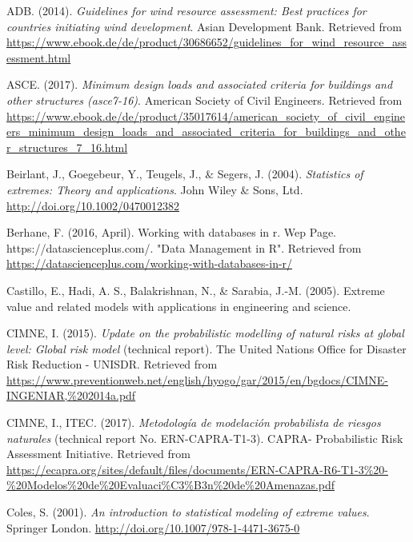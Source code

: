 \documentclass[12pt,oneside]{reedthesis}
\begin{document}

\hypertarget{refs}{}
\leavevmode\hypertarget{ref-windassessment}{}%
ADB. (2014). \emph{Guidelines for wind resource assessment: Best practices for countries initiating wind development}. Asian Development Bank. Retrieved from \url{https://www.ebook.de/de/product/30686652/guidelines_for_wind_resource_assessment.html}

\leavevmode\hypertarget{ref-Asce2017}{}%
ASCE. (2017). \emph{Minimum design loads and associated criteria for buildings and other structures (asce7-16)}. American Society of Civil Engineers. Retrieved from \url{https://www.ebook.de/de/product/35017614/american_society_of_civil_engineers_minimum_design_loads_and_associated_criteria_for_buildings_and_other_structures_7_16.html}

\leavevmode\hypertarget{ref-Beirlant2004}{}%
Beirlant, J., Goegebeur, Y., Teugels, J., \& Segers, J. (2004). \emph{Statistics of extremes: Theory and applications}. John Wiley \& Sons, Ltd. \url{http://doi.org/10.1002/0470012382}

\leavevmode\hypertarget{ref-databasesinr}{}%
Berhane, F. (2016, April). Working with databases in r. Wep Page. https://datascienceplus.com/. "Data Management in R". Retrieved from \url{https://datascienceplus.com/working-with-databases-in-r/}

\leavevmode\hypertarget{ref-Castillo2005}{}%
Castillo, E., Hadi, A. S., Balakrishnan, N., \& Sarabia, J.-M. (2005). Extreme value and related models with applications in engineering and science.

\leavevmode\hypertarget{ref-hurricanemaps}{}%
CIMNE, I. (2015). \emph{Update on the probabilistic modelling of natural risks at global level: Global risk model} (technical report). The United Nations Office for Disaster Risk Reduction - UNISDR. Retrieved from \url{https://www.preventionweb.net/english/hyogo/gar/2015/en/bgdocs/CIMNE-INGENIAR,\%202014a.pdf}

\leavevmode\hypertarget{ref-hurricanemaps2}{}%
CIMNE, I., ITEC. (2017). \emph{Metodología de modelación probabilista de riesgos naturales} (technical report No. ERN-CAPRA-T1-3). CAPRA- Probabilistic Risk Assessment Initiative. Retrieved from \url{https://ecapra.org/sites/default/files/documents/ERN-CAPRA-R6-T1-3\%20-\%20Modelos\%20de\%20Evaluaci\%C3\%B3n\%20de\%20Amenazas.pdf}

\leavevmode\hypertarget{ref-Coles2001}{}%
Coles, S. (2001). \emph{An introduction to statistical modeling of extreme values}. Springer London. \url{http://doi.org/10.1007/978-1-4471-3675-0}
\end{document}
